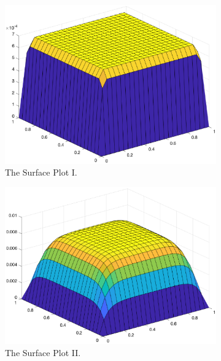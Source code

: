 \documentclass [a4paper, 12pt]{article}
\begin{document}
\begin {figure} [h!]
\centering
\begin {subfigure} [b] {0.3\linewidth}
      \includegraphics [width=\linewidth] {fda_1.eps}
      \caption {The Surface Plot I.}
\end {subfigure}
\begin {subfigure} [b] {0.3\linewidth}
      \includegraphics [width=\linewidth] {fda_2.eps}
      \caption {The Surface Plot II.}
\end {subfigure}
\begin {subfigure} [b] {0.3\linewidth}

\end{subfigure}
\end{figure}
\end{document}
